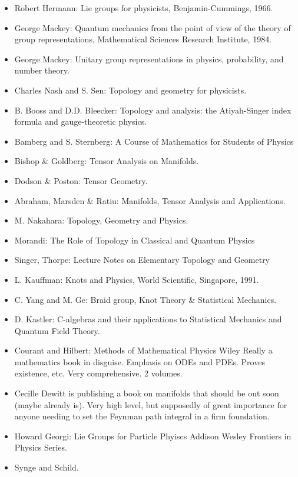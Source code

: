 \documentclass[10pt,a4paper]{book}
\theoremstyle{definition}
\begin{document}
\begin{itemize}
\item Robert Hermann: Lie groups for physicists, Benjamin-Cummings, 1966.
\item George Mackey: Quantum mechanics from the point of view of the theory of group representations, Mathematical Sciences Research Institute, 1984.
\item George Mackey: Unitary group representations in physics, probability, and number theory.
\item Charles Nash and S. Sen: Topology and geometry for physicists.
\item B. Booss and D.D. Bleecker: Topology and analysis: the Atiyah-Singer index formula and gauge-theoretic physics.
\item Bamberg and S. Sternberg: A Course of Mathematics for Students of Physics
\item Bishop \& Goldberg: Tensor Analysis on Manifolds.
\item Dodson \& Poston: Tensor Geometry.
\item Abraham, Marsden \& Ratiu: Manifolds, Tensor Analysis and Applications.
\item M. Nakahara: Topology, Geometry and Physics.
\item Morandi: The Role of Topology in Classical and Quantum Physics
\item Singer, Thorpe: Lecture Notes on Elementary Topology and Geometry
\item L. Kauffman: Knots and Physics, World Scientific, Singapore, 1991.
\item C. Yang and M. Ge: Braid group, Knot Theory \& Statistical Mechanics.
\item D. Kastler: C-algebras and their applications to Statistical Mechanics and Quantum Field Theory.
\item Courant and Hilbert: Methods of Mathematical Physics Wiley
Really a mathematics book in disguise.  Emphasis on ODEs and PDEs.  Proves existence, etc.  Very comprehensive.  2 volumes.
\item Cecille Dewitt is publishing a book on manifolds that should be out soon (maybe already is).  Very high level, but supposedly of great importance for anyone needing to set the Feynman path integral in a firm foundation.
\item Howard Georgi: Lie Groups for Particle Phyiscs Addison Wesley Frontiers in Physics Series.
\item Synge and Schild.
\end{itemize}
\end{document}
